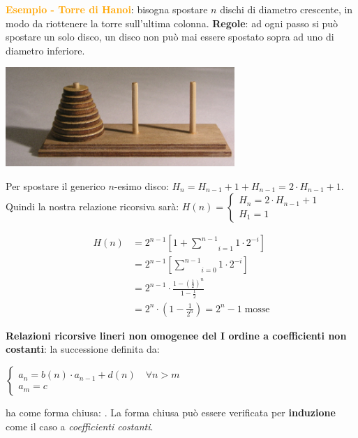 \begin{boxA}
    \textcolor{orange}{\textbf{Esempio - Torre di Hanoi}}: bisogna spostare $n$ dischi di diametro crescente, in modo da riottenere la torre sull'ultima colonna. \textbf{Regole}: ad ogni passo si può spostare un solo disco, un disco non può mai essere spostato sopra ad uno di diametro inferiore.
    
    \begin{center}
        \includegraphics[width=0.65\textwidth]{img/hanoi}
    \end{center}

    Per spostare il generico $n$-esimo disco: $H_n = H_{n-1} + 1 + H_{n-1} = 2 \cdot H_{n-1} + 1$. Quindi la nostra relazione ricorsiva sarà:
    $H(n) = \begin{cases}
        H_n = 2 \cdot H_{n-1} + 1 \\
        H_1 = 1
    \end{cases}$
    
    \begin{align*}
        H(n) &= 2^{n-1} [1 + \underset{i=1}{\overset{n-1}{\sum}}1 \cdot 2^{-i}] \\
        &= 2^{n-1} [\underset{i=0}{\overset{n-1}{\sum}}1 \cdot 2^{-i}] \\
        &= 2^{n-1} \cdot \frac{1-(\frac{1}{2})^n}{1-\frac{1}{2}} \\
        &= 2^n \cdot (1 - \frac{1}{2^n}) = 2^n - 1 \; \text{mosse}
    \end{align*}
\end{boxA}

\begin{flushleft}
    \textbf{Relazioni ricorsive lineri non omogenee del I ordine a coefficienti non costanti}: la successione definita da:

    {\centering
        $\begin{cases}
            a_n = b(n) \cdot a_{n-1} + d(n) \quad \forall n > m \\
            a_m = c
        \end{cases}$
    \par}
    ha come forma chiusa: . La forma chiusa può essere verificata per \textbf{induzione} come il caso a \textit{coefficienti costanti}.
\end{flushleft}

